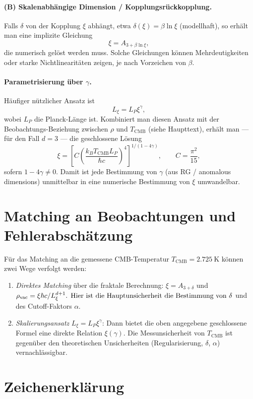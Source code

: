	\paragraph{(B) Skalenabhängige Dimension / Kopplungsrückkopplung.} Falls \(\delta\) von der Kopplung \(\xi\) abhängt, etwa \(\delta(\xi)=\beta\ln\xi\) (modellhaft), so erhält man eine implizite Gleichung
	\[
	\xi = A_{3+\beta\ln\xi},
	\]
	die numerisch gelöst werden muss. Solche Gleichungen können Mehrdeutigkeiten oder starke Nichtlinearitäten zeigen, je nach Vorzeichen von \(\beta\).
	
	\paragraph{Parametrisierung über \(\gamma\).} Häufiger nützlicher Ansatz ist
	\[
	L_\xi = L_P\xi^{\gamma},
	\]
	wobei \(L_P\) die Planck-Länge ist. Kombiniert man diesen Ansatz mit der Beobachtungs-Beziehung zwischen \(\rho\) und \(T_{\mathrm{CMB}}\) (siehe Haupttext), erhält man — für den Fall \(d=3\) — die geschlossene Lösung
	\[
	\xi = \left[ C \left(\frac{k_B T_{\mathrm{CMB}} L_P}{\hbar c}\right)^4 \right]^{1/(1-4\gamma)},\qquad C=\frac{\pi^2}{15},
	\]
	sofern \(1-4\gamma\neq 0\). Damit ist jede Bestimmung von \(\gamma\) (aus RG / anomalous dimensions) unmittelbar in eine numerische Bestimmung von \(\xi\) umwandelbar.
	
	\section{Matching an Beobachtungen und Fehlerabschätzung}
	Für das Matching an die gemessene CMB-Temperatur \(T_{\mathrm{CMB}}=2.725\ \mathrm{K}\) können zwei Wege verfolgt werden:
	\begin{enumerate}
		\item \emph{Direktes Matching} über die fraktale Berechnung: \(\xi=A_{3+\delta}\) und \(\rho_{\mathrm{vac}}=\xi\hbar c/L_\xi^{d+1}$. Hier ist die Hauptunsicherheit die Bestimmung von \(\delta\) und des Cutoff-Faktors \(\alpha\).
		\item \emph{Skalierungsansatz} \(L_\xi=L_P\xi^\gamma\): Dann bietet die oben angegebene geschlossene Formel eine direkte Relation \(\xi(\gamma)\). Die Messunsicherheit von \(T_{\mathrm{CMB}}\) ist gegenüber den theoretischen Unsicherheiten (Regularisierung, \(\delta\), \(\alpha\)) vernachlässigbar.
	\end{enumerate}
	
	\section{Zeichenerklärung}
	\label{sec:notation}
	
